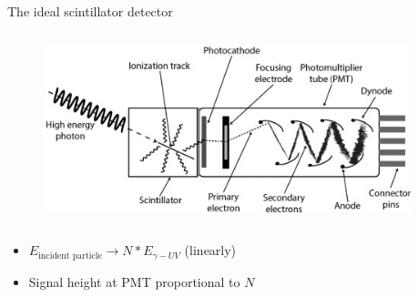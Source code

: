 \begin{columnframe}{The ideal scintillator detector}
    \begin{column}{0.5\textwidth}
        \begin{figure}
            \centering
            \includegraphics[width=0.95\textwidth]{images/perfect_scintillator.jpg}
        \end{figure}
    \end{column}
    \begin{column}{0.5\textwidth}
        \begin{itemize}
            \item $E_{\text{incident particle}} \longrightarrow N*E_{\gamma - UV}$ (linearly)
            \item Signal height at PMT proportional to $N$
        \end{itemize}
    \end{column}
\end{columnframe}

